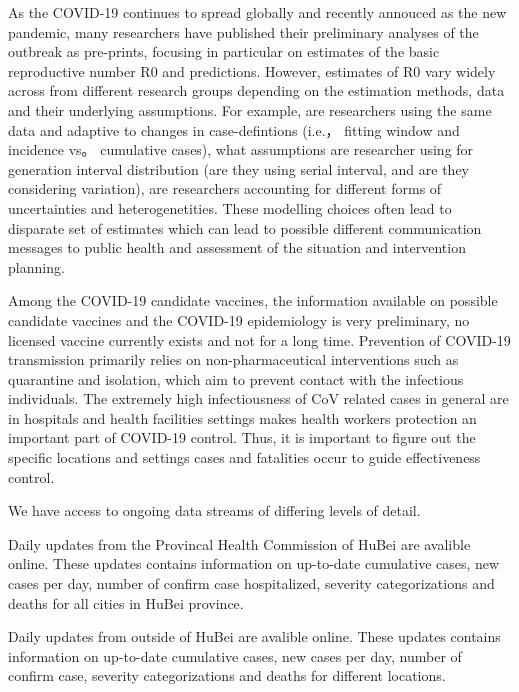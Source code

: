 As the COVID-19 continues to spread globally and recently annouced as the new pandemic, many researchers have published their preliminary analyses of the outbreak as pre-prints, focusing in particular on estimates of the basic reproductive number R0 and predictions.
However, estimates of R0 vary widely across from different research groups depending on the estimation methods, data and their underlying assumptions.
For example, are researchers using the same data and adaptive to changes in case-defintions (i.e.， fitting window and incidence vs。 cumulative cases), what assumptions are researcher using for generation interval distribution (are they using serial interval, and are they considering variation), are researchers accounting for different forms of uncertainties and heterogenetities.
These modelling choices often lead to disparate set of estimates which can lead to possible different communication messages to public health and assessment of the situation and intervention planning.

Among the COVID-19 candidate vaccines, the information available on possible candidate vaccines and the
COVID-19 epidemiology is very preliminary, no licensed vaccine currently exists and not for a long time. 
Prevention of COVID-19 transmission primarily relies on non-pharmaceutical interventions such as quarantine and isolation, which aim to prevent contact with the infectious individuals. 
The extremely high infectiousness of CoV related cases in general are in hospitals and health facilities settings makes health workers protection an important part of COVID-19 control. 
Thus, it is important to figure out the specific locations and settings cases and fatalities occur to guide effectiveness control. 




We have access to ongoing data streams of differing levels of detail. 

Daily updates from the Provincal Health Commission of HuBei are avalible online.
These updates contains information on up-to-date cumulative cases, new cases per day, number of confirm case hospitalized, severity categorizations and deaths for all cities in HuBei province.

Daily updates from outside of HuBei are avalible online.
These updates contains information on up-to-date cumulative cases, new cases per day, number of confirm case, severity categorizations and deaths for different locations.

